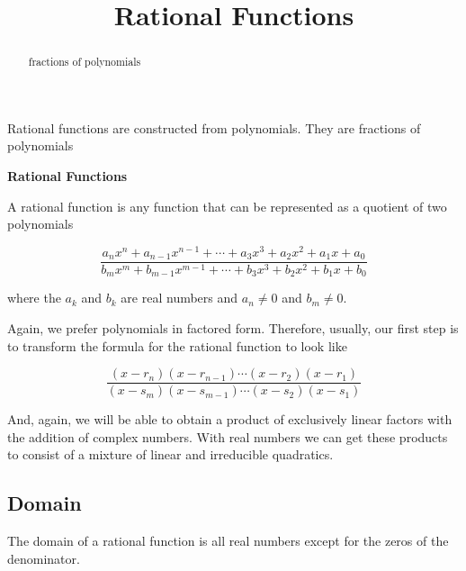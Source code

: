 \documentclass{ximera}
\title{Rational Functions}
\begin{document}
\begin{abstract}
fractions of polynomials
\end{abstract}
\maketitle








Rational functions are constructed from polynomials. They are fractions of polynomials


\begin{definition}\textbf{\textcolor{green!50!black}{Rational Functions}}

A rational function is any function that can be represented as a quotient of two polynomials 

\[   \frac{ a_n x^n + a_{n-1} x^{n-1} + \cdots + a_3 x^3 + a_2 x^2 + a_1 x + a_0  } { b_m x^m + b_{m-1} x^{m-1} + \cdots + b_3 x^3 + b_2 x^2 + b_1 x + b_0 }   \]



where the $a_k$ and $b_k$ are real numbers and $a_n \ne 0$ and $b_m \ne 0$.





\end{definition}




Again, we prefer polynomials in factored form.  Therefore, usually, our first step is to transform the formula for the rational function to look like



\[   \frac{ (x-r_n)(x-r_{n-1})  \cdots (x-r_2)(x-r_1)  } { (x-s_m)(x-s_{m-1})  \cdots (x-s_2)(x-s_1) }   \]




And, again, we will be able to obtain a product of exclusively linear factors with the addition of complex numbers.  With real numbers we can get these products to consist of a mixture of linear and irreducible quadratics.





\subsection*{Domain}


The domain of a rational function is all real numbers except for the zeros of the denominator.
\end{document}
